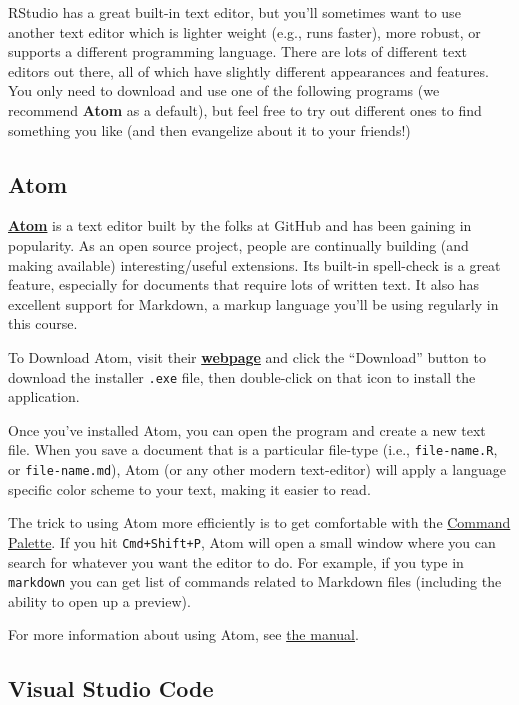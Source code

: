 \documentclass[]{book}
\theoremstyle{definition}
\theoremstyle{definition}
\theoremstyle{remark}
\begin{document}
RStudio has a great built-in text editor, but you'll sometimes want to
use another text editor which is lighter weight (e.g., runs faster),
more robust, or supports a different programming language. There are
lots of different text editors out there, all of which have slightly
different appearances and features. You only need to download and use
one of the following programs (we recommend \textbf{Atom} as a default),
but feel free to try out different ones to find something you like (and
then evangelize about it to your friends!)

\subsection{Atom}\label{atom}

\href{https://atom.io/}{\textbf{Atom}} is a text editor built by the
folks at GitHub and has been gaining in popularity. As an open source
project, people are continually building (and making available)
interesting/useful extensions. Its built-in spell-check is a great
feature, especially for documents that require lots of written text. It
also has excellent support for Markdown, a markup language you'll be
using regularly in this course.

To Download Atom, visit their \href{https://atom.io/}{\textbf{webpage}}
and click the ``Download'' button to download the installer
\texttt{.exe} file, then double-click on that icon to install the
application.

Once you've installed Atom, you can open the program and create a new
text file. When you save a document that is a particular file-type
(i.e., \texttt{file-name.R}, or \texttt{file-name.md}), Atom (or any
other modern text-editor) will apply a language specific color scheme to
your text, making it easier to read.

The trick to using Atom more efficiently is to get comfortable with the
\href{http://flight-manual.atom.io/getting-started/sections/atom-basics/\#command-palette}{Command
Palette}. If you hit \texttt{Cmd+Shift+P}, Atom will open a small window
where you can search for whatever you want the editor to do. For
example, if you type in \texttt{markdown} you can get list of commands
related to Markdown files (including the ability to open up a preview).

For more information about using Atom, see
\href{http://flight-manual.atom.io/}{the manual}.

\subsection{Visual Studio Code}\label{visual-studio-code}
\end{document}
